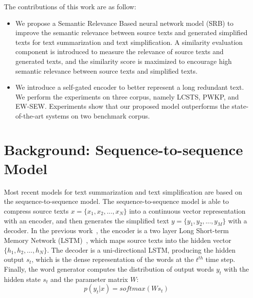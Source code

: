 \documentclass{clv3}
\begin{document}
\begin{CJK*}{UTF8}{gbsn}
The contributions of this work are as follow:
\begin{itemize}
	\item We propose a Semantic Relevance Based neural network model (SRB) to improve the semantic relevance between source texts and generated simplified texts for text summarization and text simplification. A similarity evaluation component is introduced to measure the relevance of source texts and generated texts, and the similarity score is maximized to encourage high semantic relevance between source texts and simplified texts.
	\item We introduce a self-gated encoder to better represent a long redundant text. We perform the experiments on three corpus, namely LCSTS, PWKP, and EW-SEW. Experiments show that our proposed model outperforms the state-of-the-art systems on two benchmark corpus.
\end{itemize}


\section{Background: Sequence-to-sequence Model}

Most recent models for text summarization and text simplification are based on the sequence-to-sequence model. The sequence-to-sequence model is able to compress source texts $x=\{x_1,x_2,...,x_N\}$ into a continuous vector representation with an encoder, and then generates the simplified text $y=\{y_1,y_2,...,y_M\}$ with a decoder. In the previous work~\cite{NisioiEA2017,lcsts}, the encoder is a two layer Long Short-term Memory Network (LSTM)~\cite{LSTM}, which maps source texts into the hidden vector $\{h_1,h_2,...,h_N\}$. The decoder is a uni-directional LSTM, producing the hidden output $s_t$, which is the dense representation of the words at the $t^{th}$ time step. Finally, the word generator computes the distribution of output words $y_t$ with the hidden state $s_t$ and the parameter matrix $W$:
\begin{equation}\label{generator1}
p(y_t|x)=softmax{(Ws_t)}
\end{equation}


\end{CJK*}
\end{document}
